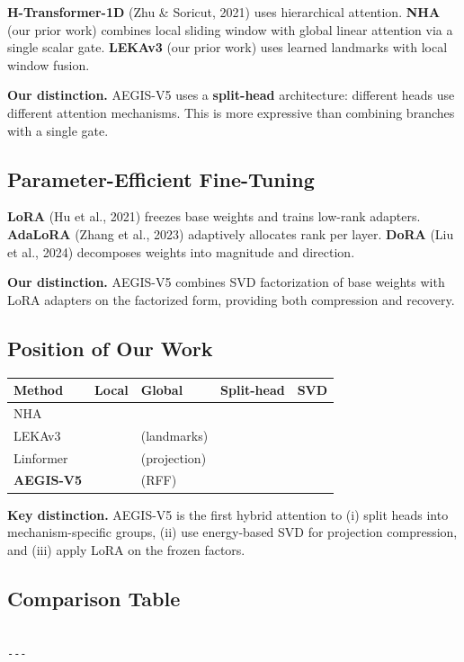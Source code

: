 \textbf{H-Transformer-1D} (Zhu \& Soricut, 2021) uses hierarchical attention. 
\textbf{NHA} (our prior work) combines local sliding window with global linear 
attention via a single scalar gate. \textbf{LEKAv3} (our prior work) uses 
learned landmarks with local window fusion.

\textbf{Our distinction.} AEGIS-V5 uses a \textbf{split-head} architecture: different 
heads use different attention mechanisms. This is more expressive than 
combining branches with a single gate.

\subsection{Parameter-Efficient Fine-Tuning}

\textbf{LoRA} (Hu et al., 2021) freezes base weights and trains low-rank 
adapters. \textbf{AdaLoRA} (Zhang et al., 2023) adaptively allocates rank per 
layer. \textbf{DoRA} (Liu et al., 2024) decomposes weights into magnitude and 
direction.

\textbf{Our distinction.} AEGIS-V5 combines SVD factorization of base weights 
with LoRA adapters on the factorized form, providing both compression and 
recovery.

\subsection{Position of Our Work}

\begin{table}[H]
\centering
\small
\begin{tabular}{lllll}
\toprule
\textbf{Method} & \textbf{Local} & \textbf{Global} & \textbf{Split-head} & \textbf{SVD} \\
\midrule
NHA &  &  &  &  \\
LEKAv3 &  & (landmarks) &  &  \\
Linformer &  & (projection) &  &  \\
\textbf{AEGIS-V5} &  & (RFF) & \textbf{ } & \textbf{ } \\
\bottomrule
\end{tabular}
\end{table}

\textbf{Key distinction.} AEGIS-V5 is the first hybrid attention to (i) split 
heads into mechanism-specific groups, (ii) use energy-based SVD for 
projection compression, and (iii) apply LoRA on the frozen factors.



\subsection{Comparison Table}

\begin{lstlisting}

---
\end{lstlisting}